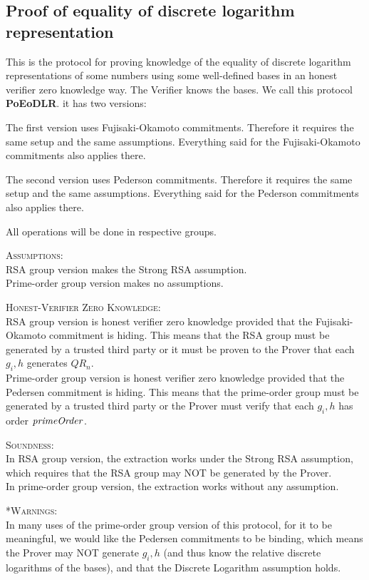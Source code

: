 \subsection{Proof of equality of discrete logarithm representation}

This is the protocol for proving knowledge of the equality of discrete logarithm representations of some numbers using some well-defined bases in an honest verifier zero knowledge way. The Verifier knows the bases. We call this protocol \textbf{PoEoDLR}. it has two versions:

The first version uses Fujisaki-Okamoto commitments. Therefore it requires the same setup and the same assumptions. Everything said for the Fujisaki-Okamoto commitments also applies there.

The second version uses Pederson commitments. Therefore it requires the same setup and the same assumptions. Everything said for the Pederson commitments also applies there.

All operations will be done in respective groups.


\textsc{Assumptions}:\\
RSA group version makes the Strong RSA assumption.\\
Prime-order group version makes no assumptions.


\textsc{Honest-Verifier Zero Knowledge}:\\
RSA group version is honest verifier zero knowledge provided that the Fujisaki-Okamoto commitment is hiding. This means that the RSA group must be generated by a trusted third party or it must be proven to the Prover that each $g_i,h$ generates $QR_n$.\\
Prime-order group version is honest verifier zero knowledge provided that the Pedersen commitment is hiding. This means that the prime-order group must be generated by a trusted third party or the Prover must verify that each $g_i,h$ has order $ \mathit{primeOrder} $.



\textsc{Soundness}:\\
In RSA group version, the extraction works under the Strong RSA assumption, which requires that the RSA group may NOT be generated by the Prover.\\
In prime-order group version, the extraction works without any assumption.



\textsc{*Warnings}:\\
In many uses of the prime-order group version of this protocol, for it to be meaningful, we would like the Pedersen commitments to be binding, which means the Prover may NOT generate $g_i,h$ (and thus know the relative discrete logarithms of the bases), and that the Discrete Logarithm assumption holds.



